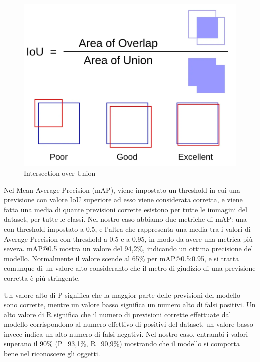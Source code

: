 \documentclass{article}
\begin{document}
  \begin{figure}[h!]
    \centering
    \includegraphics[width=0.35\linewidth]{img/iou.png}
    \caption{Intersection over Union}
  \end{figure}
  
  \newpage

  Nel Mean Average Precision (mAP), viene impostato un threshold in cui una previsione con valore IoU superiore ad esso viene considerata corretta, e viene fatta una media di quante previsioni corrette esistono per tutte le immagini del dataset, per tutte le classi.
  Nel nostro caso abbiamo due metriche di mAP: una con threshold impostato a 0.5, e l'altra che rappresenta una media tra i valori di Average Precision con threshold a 0.5 e a 0.95, in modo da avere una metrica più severa.
  mAP@0.5 mostra un valore del 94,2\%, indicando un ottima precisione del modello. Normalmente il valore scende al 65\% per mAP@0.5:0.95, e si tratta comunque di un valore alto consideranto che il metro di giudizio di una previsione corretta è più stringente.

  Un valore alto di P significa che la maggior parte delle previsioni del modello sono corrette, mentre un valore basso significa un numero alto di falsi positivi.
  Un alto valore di R significa che il numero di previsioni corrette effettuate dal modello corrispondono al numero effettivo di positivi del dataset, un valore basso invece indica un alto numero di falsi negativi.
   Nel nostro caso, entrambi i valori superano il 90\% (P=93,1\%, R=90,9\%) mostrando che il modello si comporta bene nel riconoscere gli oggetti.
\end{document}
